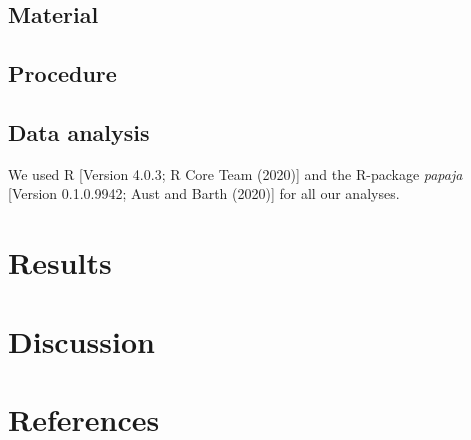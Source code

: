 \documentclass[
  english,
  man]{apa6}
\begin{document}
\hypertarget{material}{%
\subsection{Material}\label{material}}

\hypertarget{procedure}{%
\subsection{Procedure}\label{procedure}}

\hypertarget{data-analysis}{%
\subsection{Data analysis}\label{data-analysis}}

We used R {[}Version 4.0.3; R Core Team (2020){]} and the R-package \emph{papaja} {[}Version 0.1.0.9942; Aust and Barth (2020){]} for all our analyses.

\hypertarget{results}{%
\section{Results}\label{results}}

\hypertarget{discussion}{%
\section{Discussion}\label{discussion}}

\newpage

\hypertarget{references}{%
\section{References}\label{references}}

\begingroup
\setlength{\parindent}{-0.5in}
\setlength{\leftskip}{0.5in}
\end{document}
